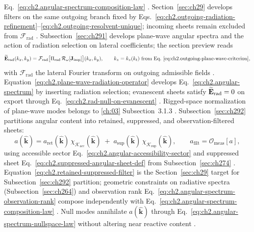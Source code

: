 Eq.~\eqref{eq:ch2.angular-spectrum-composition-law} \cite{stratton1941}. Section~\ref{sec:ch29}
develops filters on the same outgoing branch fixed by
Eqs.~\eqref{eq:ch2.outgoing-radiation-refinement}--\eqref{eq:ch2.outgoing-resolvent-unique};
incoming sheets remain excluded from \(\mathcal{F}_{\mathrm{rad}}\)
\cite{harrington2001}.
Subsection~\ref{sec:ch291} develops plane-wave angular spectra and the action of radiation
selection on lateral coefficients; the section preview reads \begin{equation}
\widetilde{\mathbf{E}}_{\mathrm{rad}}(k_x,k_y)
=
\mathcal{F}_{\mathrm{rad}}\big[\Pi_{\mathrm{rad}}\,\mathcal{R}_\omega[\mathbf{J}_{\mathrm{imp}}]\big](k_x,k_y),
\qquad
k_z=k_z(k_t)\ \text{from Eq.~\eqref{eq:ch2.outgoing-plane-wave-criterion}},
\end{equation}
with \(\mathcal{F}_{\mathrm{rad}}\) the lateral Fourier transform on outgoing admissible fields
\cite{stratton1941}. Equation~\eqref{eq:ch2.plane-wave-radiation-operator}
develops Eq.~\eqref{eq:ch2.angular-spectrum} by inserting radiation selection;
evanescent sheets satisfy \(\widetilde{\mathbf{E}}_{\mathrm{rad}}=0\) on export through
Eq.~\eqref{eq:ch2.rad-null-on-evanescent} \cite{stratton1941}. Rigged-space normalization of
plane-wave modes belongs to \ref{ch:03} Subsection~3.1.3 \cite{harrington2001}.
Subsection~\ref{sec:ch292} partitions angular content into retained, suppressed, and
observation-filtered sheets:
\begin{equation}
\label{eq:ch2.retained-suppressed-filter}
a(\widehat{\mathbf{k}})
=
a_{\mathrm{ret}}(\widehat{\mathbf{k}})\,\chi_{\mathcal{K}_{\mathrm{acc}}}(\widehat{\mathbf{k}})
\;+\;
a_{\mathrm{sup}}(\widehat{\mathbf{k}})\,\chi_{\mathcal{K}_{\mathrm{sup}}}(\widehat{\mathbf{k}}),
\qquad
a_{\mathrm{filt}}=\mathcal{O}_{\mathrm{meas}}[a],
\end{equation}
using accessible sector Eq.~\eqref{eq:ch2.angular-accessibility-sector} and suppressed sheet
Eq.~\eqref{eq:ch2.suppressed-angular-sheet-def} from Subsection~\ref{sec:ch274}
\cite{stratton1941}. Equation~\eqref{eq:ch2.retained-suppressed-filter}
is the Section~\ref{sec:ch29} target for Subsection~\ref{sec:ch292} partition; geometric
constraints on radiative spectra (Subsection~\ref{sec:ch264}) and observation rank
Eq.~\eqref{eq:ch2.angular-spectrum-observation-rank} compose independently with
Eq.~\eqref{eq:ch2.angular-spectrum-composition-law} \cite{stratton1941}. Null modes annihilate
\(a(\widehat{\mathbf{k}})\) through Eq.~\eqref{eq:ch2.angular-spectrum-nullspace-law} without
altering near reactive content \cite{harrington2001}.
